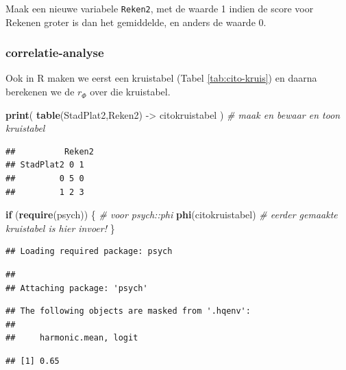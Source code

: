 \documentclass[
]{book}
\newenvironment{Shaded}{\begin{snugshade}}{\end{snugshade}}
\newcommand{\CommentTok}[1]{\textcolor[rgb]{0.56,0.35,0.01}{\textit{#1}}}
\newcommand{\ControlFlowTok}[1]{\textcolor[rgb]{0.13,0.29,0.53}{\textbf{#1}}}
\newcommand{\KeywordTok}[1]{\textcolor[rgb]{0.13,0.29,0.53}{\textbf{#1}}}
\newcommand{\NormalTok}[1]{#1}
\newcommand{\StringTok}[1]{\textcolor[rgb]{0.31,0.60,0.02}{#1}}
\begin{document}
Maak een nieuwe variabele \texttt{Reken2}, met de waarde 1 indien de score
voor Rekenen groter is dan het gemiddelde, en anders de waarde 0.

\hypertarget{correlatie-analyse-2}{%
\subsubsection{correlatie-analyse}\label{correlatie-analyse-2}}

Ook in R maken we eerst een kruistabel (Tabel \ref{tab:cito-kruis}) en daarna berekenen we de \(r_\Phi\) over die kruistabel.

\begin{Shaded}
\begin{Highlighting}[]
\KeywordTok{print}\NormalTok{( }\KeywordTok{table}\NormalTok{(StadPlat2,Reken2) {-}\textgreater{}}\StringTok{ }\NormalTok{citokruistabel ) }\CommentTok{\# maak en bewaar en toon kruistabel}
\end{Highlighting}
\end{Shaded}

\begin{verbatim}
##          Reken2
## StadPlat2 0 1
##         0 5 0
##         1 2 3
\end{verbatim}

\begin{Shaded}
\begin{Highlighting}[]
\ControlFlowTok{if}\NormalTok{ (}\KeywordTok{require}\NormalTok{(psych)) \{ }\CommentTok{\# voor psych::phi}
  \KeywordTok{phi}\NormalTok{(citokruistabel) }\CommentTok{\# eerder gemaakte kruistabel is hier invoer!}
\NormalTok{\}}
\end{Highlighting}
\end{Shaded}

\begin{verbatim}
## Loading required package: psych
\end{verbatim}

\begin{verbatim}
## 
## Attaching package: 'psych'
\end{verbatim}

\begin{verbatim}
## The following objects are masked from '.hqenv':
## 
##     harmonic.mean, logit
\end{verbatim}

\begin{verbatim}
## [1] 0.65
\end{verbatim}
\end{document}
